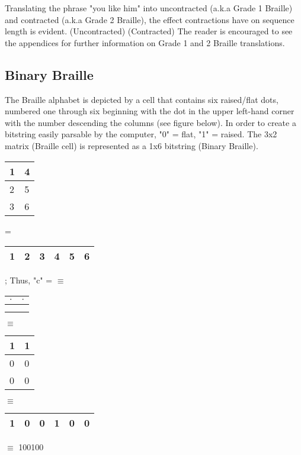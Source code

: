 \documentclass[26pt]{article}
\begin{document}
Translating the phrase "you like him" into uncontracted (a.k.a Grade 1 Braille) and contracted (a.k.a Grade 2 Braille), the effect contractions have on sequence length is evident. \newline
{} (Uncontracted) \newline \newline
{}  (Contracted) \vspace{+10pt} \newline The reader is encouraged to see the appendices for further information on Grade 1 and 2 Braille translations. 

\subsection{Binary Braille}

The Braille alphabet is depicted by a cell that contains six raised/flat dots, numbered one through six beginning with the dot in the upper left-hand corner with the number descending the columns (see figure below).  In order to create a bitstring easily parsable by the computer,  "0" = flat, "1" = raised. The 3x2 matrix (Braille cell) is represented as a 1x6 bitstring (Binary Braille). \newline
\begin{tabular}{|l|l|}
\hline 1 & 4  \\ \hline 2&5 \\ \hline  3 & 6\\ \hline
\end{tabular} = \begin{tabular}{|l|l|l|l|l|l|}
\hline 1 & 2 & 3 & 4 & 5 & 6 \\ \hline
\end{tabular} ; Thus, "c" =  $\equiv$ \begin{tabular}{|l|l|}
\hline $\cdot$ & $\cdot$ \\ \hline & \\ \hline  & \\ \hline
\end{tabular} $\equiv$ \begin{tabular}{|l|l|}
\hline 1 & 1  \\ \hline 0&0 \\ \hline  0 & 0 \\ \hline
\end{tabular} $\equiv$
\begin{tabular}{|l|l|l|l|l|l|}
\hline 1 & 0 & 0 & 1 & 0 & 0 \\ \hline
\end{tabular} $\equiv$ 100100
\end{document}
